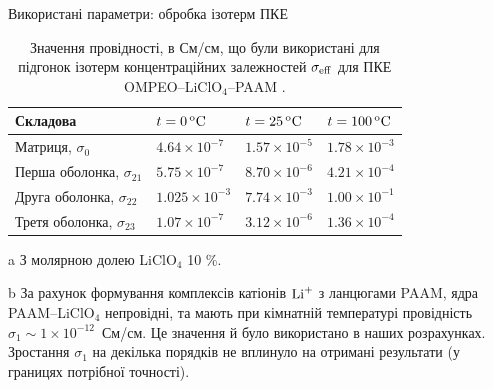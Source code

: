 \documentclass[10pt]{beamer}
\begin{document}
\begin{frame}{Використані параметри: обробка ізотерм ПКЕ}
\footnotesize

\begin{table}[tb]
	\centering
	\begin{threeparttable}
		\caption{\label{tab:isotherms} Значення провідності, в См/см, що були використані для підгонок ізотерм концентраційних залежностей $\sigma_{\rm{eff}}$ для ПКЕ OMPEO--LiClO$_4$--PAAM . }
		
		\begin{tabular}{|l|l|l|l|}
			\hline
			\textrm{Складова}   & $t = 0\,\rm { ^oC}$ & $t = 25\, \rm {^oC}$ & $t = 100\, \rm {^oC}$ \\
			\hline
			Матриця, $\sigma_0$           &  $4.64\times 10^{-7}$  &  $1.57\times 10^{-5}$  &  $1.78\times 10^{-3}$   \\
			Перша оболонка, $\sigma_{21}$   &  $5.75\times 10^{-7}$  &  $8.70\times 10^{-6}$  &  $4.21\times 10^{-4}$    \\
			Друга оболонка, $\sigma_{22}$  &  $1.025\times 10^{-3}$ &  $7.74\times 10^{-3}$  &  $1.00\times 10^{-1}$   \\
			Третя оболонка, $\sigma_{23}$   &  $1.07\times 10^{-7}$  &  $3.12\times 10^{-6}$  &  $1.36\times 10^{-4}$ \\
			\hline
		\end{tabular}
		\begin{tablenotes}
			\item[a] З молярною долею LiClO$_4$ 10 \%. 
			\item[b] За рахунок формування комплексів катіонів $\rm{Li}^+ $
			з ланцюгами PAAM, ядра PAAM--LiClO$_4$ непровідні, та мають
			при кімнатній температурі провідність 
			$\sigma_1\sim 1\times 10^{-12}$~См/см. 
			Це значення й було використано в наших розрахунках.
			Зростання $\sigma_1$ на декілька порядків не вплинуло
			на отримані результати (у границях потрібної точності).
		\end{tablenotes}
	\end{threeparttable}
\end{table}

\end{frame}
\end{document}
